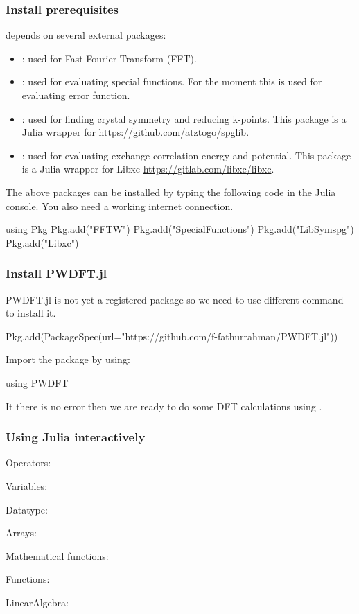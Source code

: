 \begin{frame}[fragile]
\frametitle{Install prerequisites}

 depends on several external packages:
\begin{itemize}
\item {}: used for Fast Fourier Transform (FFT).
\item {}: used for evaluating special functions. For the moment
  this is used for evaluating error function.
\item {}: used for finding crystal symmetry and reducing k-points.
  This package is a Julia wrapper for 
  {\scriptsize\url{https://github.com/atztogo/spglib}}.
\item {}: used for evaluating exchange-correlation energy and potential.
  This package is a Julia wrapper for Libxc {\scriptsize\url{https://gitlab.com/libxc/libxc}}.
\end{itemize}

The above packages can be installed by typing the following code in the Julia console.
You also need a working internet connection.
\begin{juliacode}
using Pkg
Pkg.add("FFTW")
Pkg.add("SpecialFunctions")
Pkg.add("LibSymspg")
Pkg.add("Libxc")
\end{juliacode}

\end{frame}



\begin{frame}[fragile]
\frametitle{Install PWDFT.jl}

PWDFT.jl is not yet a registered package so we need to use different command
to install it.
\begin{juliacode}
Pkg.add(PackageSpec(url="https://github.com/f-fathurrahman/PWDFT.jl"))
\end{juliacode}

Import the package by using:
\begin{juliacode}
using PWDFT
\end{juliacode}

It there is no error then we are ready to do some DFT calculations using
.

\end{frame}


\begin{frame}[fragile]
\frametitle{Using Julia interactively}

Operators:

Variables:

Datatype:

Arrays:

Mathematical functions:

Functions:

LinearAlgebra:

\end{frame}
